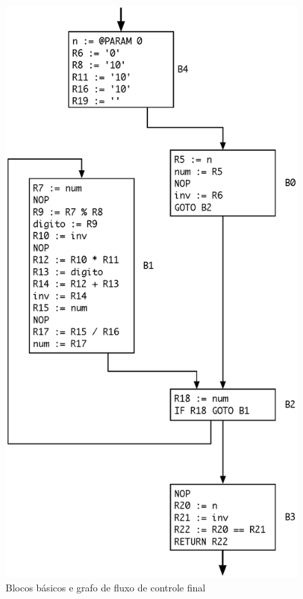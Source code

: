 \begin{figure}[ht!]
  \centering
  \includegraphics[scale=0.68]{figs/palindromo_bbs2}
  \caption{Blocos básicos e grafo de fluxo de controle final\label{bbs2}}
\end{figure}

